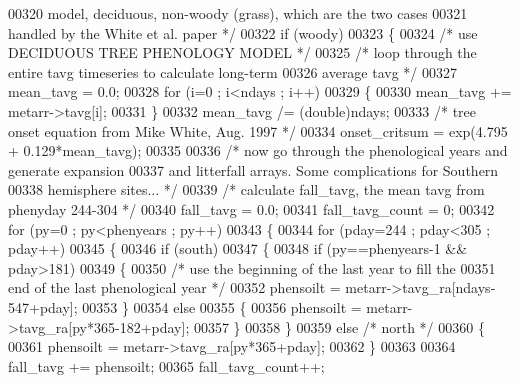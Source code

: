 \begin{DoxyCode}
{{00320 \textcolor{comment}{        model, deciduous, non-woody (grass), which are the two cases}
00321 \textcolor{comment}{        handled by the White et al. paper */}
00322         \textcolor{keywordflow}{if} (woody)
00323         \{
00324             \textcolor{comment}{/* use DECIDUOUS TREE PHENOLOGY MODEL */}
00325             \textcolor{comment}{/* loop through the entire tavg timeseries to calculate long-term}
00326 \textcolor{comment}{            average tavg */}
00327             mean\_tavg = 0.0;
00328             \textcolor{keywordflow}{for} (i=0 ; i<ndays ; i++)
00329             \{
00330                 mean\_tavg += metarr->tavg[i];
00331             \}
00332             mean\_tavg /= (double)ndays;
00333             \textcolor{comment}{/* tree onset equation from Mike White, Aug. 1997 */}
00334             onset\_critsum = exp(4.795 + 0.129*mean\_tavg);
00335             
00336             \textcolor{comment}{/* now go through the phenological years and generate expansion}
00337 \textcolor{comment}{            and litterfall arrays. Some complications for Southern}
00338 \textcolor{comment}{            hemisphere sites... */}
00339             \textcolor{comment}{/* calculate fall\_tavg, the mean tavg from phenyday 244-304 */}
00340             fall\_tavg = 0.0;
00341             fall\_tavg\_count = 0;
00342             \textcolor{keywordflow}{for} (py=0 ; py<phenyears ; py++)
00343             \{
00344                 \textcolor{keywordflow}{for} (pday=244 ; pday<305 ; pday++)
00345                 \{
00346                     \textcolor{keywordflow}{if} (south)
00347                     \{
00348                         \textcolor{keywordflow}{if} (py==phenyears-1 && pday>181)
00349                         \{
00350                             \textcolor{comment}{/* use the beginning of the last year to fill the}
00351 \textcolor{comment}{                            end of the last phenological year */}
00352                             phensoilt = metarr->tavg\_ra[ndays-547+pday];
00353                         \}
00354                         \textcolor{keywordflow}{else}
00355                         \{
00356                             phensoilt = metarr->tavg\_ra[py*365-182+pday];
00357                         \}
00358                     \}
00359                     \textcolor{keywordflow}{else} \textcolor{comment}{/* north */}
00360                     \{
00361                         phensoilt = metarr->tavg\_ra[py*365+pday];
00362                     \}
00363                     
00364                     fall\_tavg += phensoilt;
00365                     fall\_tavg\_count++;
}}
\end{DoxyCode}
